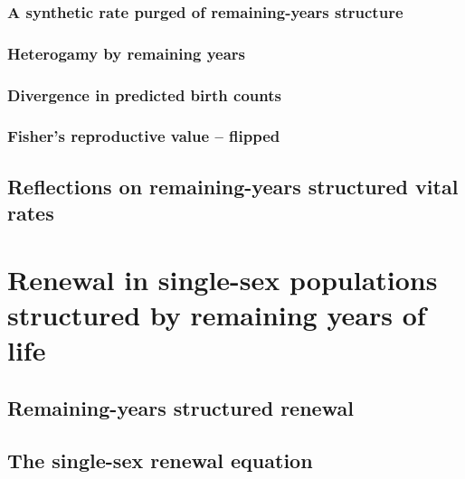     \subsection{A synthetic rate purged of remaining-years structure}
      
    
    \subsection{Heterogamy by remaining years}
      
      
    \subsection{Divergence in predicted birth counts}
      
    \subsection{Fisher's reproductive value -- flipped}
      
  \section{Reflections on remaining-years structured vital rates}
      

  \chapter{Renewal in single-sex populations structured by remaining years of
life}
    
    \section{Remaining-years structured renewal}
      
    \section{The single-sex renewal equation}
      
